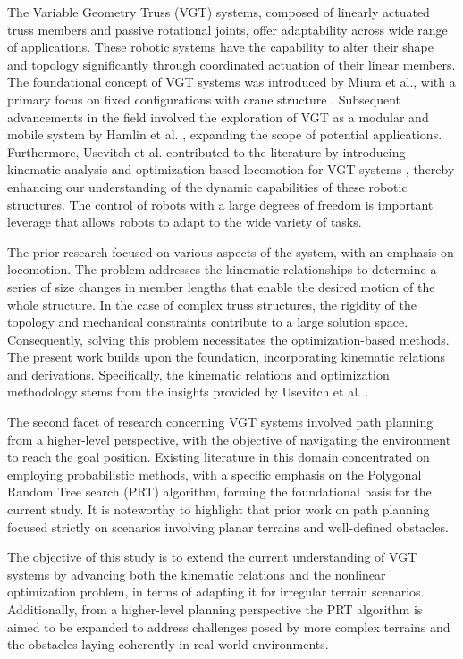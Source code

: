 \documentclass{IEEEtaes}
\begin{document}
{\scshape T}he Variable Geometry Truss (VGT) systems, composed of linearly actuated truss members and passive rotational joints, offer adaptability across wide range of applications. These robotic systems have the capability to alter their shape and topology significantly through coordinated actuation of their linear members. The foundational concept of VGT systems was introduced by Miura et al., with a primary focus on fixed configurations with crane structure \cite{miura}. Subsequent advancements in the field involved the exploration of VGT as a modular and mobile system by Hamlin et al. \cite{hamlin}, expanding the scope of potential applications. Furthermore, Usevitch et al. contributed to the literature by introducing kinematic analysis and optimization-based locomotion for VGT systems \cite{usevitch}, thereby enhancing our understanding of the dynamic capabilities of these robotic structures. The control of robots with a large degrees of freedom is important leverage that allows robots to adapt to the wide variety of tasks.

The prior research focused on various aspects of the system, with an emphasis on locomotion. The problem addresses the kinematic relationships to determine a series of size changes in member lengths that enable the desired motion of the whole structure. In the case of complex truss structures, the rigidity of the topology and mechanical constraints contribute to a large solution space. Consequently, solving this problem necessitates the optimization-based methods. The present work builds upon the foundation, incorporating kinematic relations and derivations. Specifically, the kinematic relations and optimization methodology stems from the insights provided by Usevitch et al. \cite{usevitch}. 

The second facet of research concerning VGT systems involved path planning from a higher-level perspective, with the objective of navigating the environment to reach the goal position. Existing literature in this domain concentrated on employing probabilistic methods, with a specific emphasis on the Polygonal Random Tree search (PRT) algorithm, forming the foundational basis for the current study. It is noteworthy to highlight that prior work on path planning focused strictly on scenarios involving planar terrains and well-defined obstacles.

The objective of this study is to extend the current understanding of VGT systems by advancing both the kinematic relations and the nonlinear optimization problem, in terms of adapting it for irregular terrain scenarios. Additionally, from a higher-level planning perspective the PRT algorithm is aimed to be expanded to address challenges posed by more complex terrains and the obstacles laying coherently in real-world environments.
\end{document}
